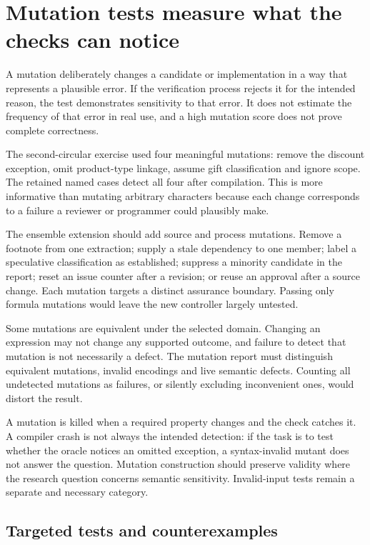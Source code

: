 \documentclass[12pt,a4paper,oneside,openany]{book}
\begin{document}
\section{Mutation tests measure what the checks can notice}
\label{merge:M07:06}


A mutation deliberately changes a candidate or implementation in a way that
represents a plausible error. If the verification process rejects it for the
intended reason, the test demonstrates sensitivity to that error. It does not
estimate the frequency of that error in real use, and a high mutation score does
not prove complete correctness.

The second-circular exercise used four meaningful mutations: remove the discount
exception, omit product-type linkage, assume gift classification and ignore scope.
The retained named cases detect all four after compilation. This is more
informative than mutating arbitrary characters because each change corresponds
to a failure a reviewer or programmer could plausibly make.

The ensemble extension should add source and process mutations. Remove a footnote
from one extraction; supply a stale dependency to one member; label a speculative
classification as established; suppress a minority candidate in the report; reset
an issue counter after a revision; or reuse an approval after a source change.
Each mutation targets a distinct assurance boundary. Passing only formula
mutations would leave the new controller largely untested.

Some mutations are equivalent under the selected domain. Changing an expression
may not change any supported outcome, and failure to detect that mutation is not
necessarily a defect. The mutation report must distinguish equivalent mutations,
invalid encodings and live semantic defects. Counting all undetected mutations as
failures, or silently excluding inconvenient ones, would distort the result.

A mutation is killed when a required property changes and the check catches it.
A compiler crash is not always the intended detection: if the task is to test
whether the oracle notices an omitted exception, a syntax-invalid mutant does not
answer the question. Mutation construction should preserve validity where the
research question concerns semantic sensitivity. Invalid-input tests remain a
separate and necessary category.

\subsection{Targeted tests and counterexamples}
\label{merge:P-04-prototype:05}
\end{document}
